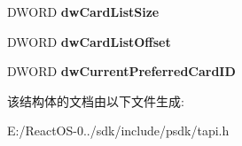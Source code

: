 \begin{DoxyCompactItemize}
\mbox{\label{structlinetranslatecaps__tag_a5fa712ad7a2de600530f694a918f1869}} 
D\+W\+O\+RD {\bfseries dw\+Card\+List\+Size}
\item 
\mbox{\label{structlinetranslatecaps__tag_aac3e18593d2dfdf9422cf8df89af4558}} 
D\+W\+O\+RD {\bfseries dw\+Card\+List\+Offset}
\item 
\mbox{\label{structlinetranslatecaps__tag_a229c21e8c23bcc72d14c36860395b0a6}} 
D\+W\+O\+RD {\bfseries dw\+Current\+Preferred\+Card\+ID}
\end{DoxyCompactItemize}


该结构体的文档由以下文件生成\+:\begin{DoxyCompactItemize}
\item 
E\+:/\+React\+O\+S-\/0../sdk/include/psdk/tapi.\+h\end{DoxyCompactItemize}
